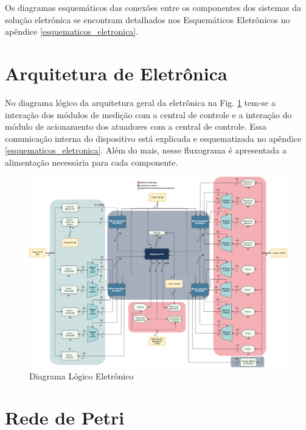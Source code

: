 Os diagramas esquemáticos das conexões entre os componentes dos sistemas da solução eletrônica se encontram detalhados nos Esquemáticos Eletrônicos no apêndice \ref{esquematicos_eletronica}.

\section{Arquitetura de Eletrônica}\label{sec:arq_eletronica}

No diagrama lógico da arquitetura geral da eletrônica na Fig. \ref{fig:fluxograma_eletronica} tem-se a interação dos módulos de medição com a central de controle e a interação do módulo de acionamento dos atuadores com a central de controle. Essa comunicação interna do dispositivo está explicada e esquematizada no apêndice \ref{esquematicos_eletronica}. Além do mais, nesse fluxograma é apresentada a alimentação necessária para cada componente.


\begin{figure}[H]
    \centering
    \includegraphics[width=1.1\textwidth]{figuras/eletronica/fluxogramas/fluxograma_eletronica.png}
    \caption{Diagrama Lógico Eletrônico}
    \label{fig:fluxograma_eletronica}
\end{figure}



\section{Rede de Petri}\label{sec:rede_petri}

